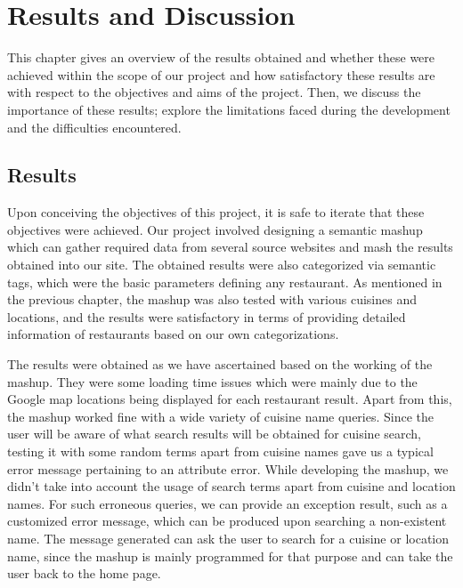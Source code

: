 \chapter{Results and Discussion}

This chapter gives an overview of the results obtained and whether these were achieved within the scope of our project and how satisfactory these results are with respect to the objectives and aims of the project. Then, we discuss the importance of these results; explore the limitations faced during the development and the difficulties encountered.

\section{Results}

Upon conceiving the objectives of this project, it is safe to iterate that these objectives were achieved. Our project involved designing a semantic mashup which can gather required data from several source websites and mash the results obtained into our site. The obtained results were also categorized via semantic tags, which were the basic parameters defining any restaurant. As mentioned in the previous chapter, the mashup was also tested with various cuisines and locations, and the results were satisfactory in terms of providing detailed information of restaurants based on our own categorizations.

The results were obtained as we have ascertained based on the working of the mashup. They were some loading time issues which were mainly due to the Google map locations being displayed for each restaurant result. Apart from this, the mashup worked fine with a wide variety of cuisine name queries. Since the user will be aware of what search results will be obtained for cuisine search, testing it with some random terms apart from cuisine names gave us a typical error message pertaining to an attribute error. While developing the mashup, we didn’t take into account the usage of search terms apart from cuisine and location names. For such erroneous queries, we can provide an exception result, such as a customized error message, which can be produced upon searching a non-existent name. The message generated can ask the user to search for a cuisine or location name, since the mashup is mainly programmed for that purpose and can take the user back to the home page.

